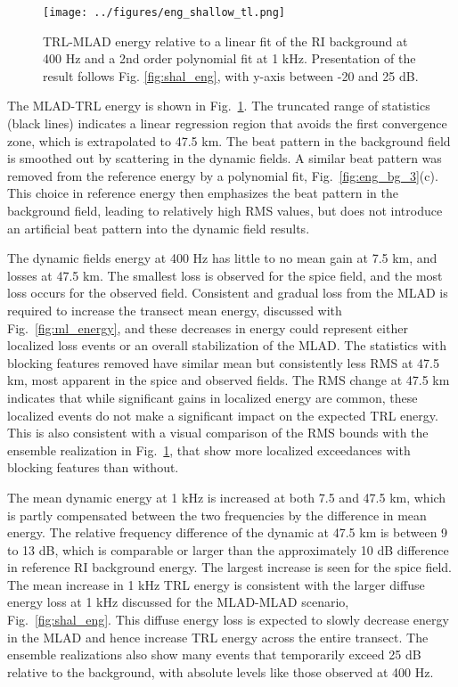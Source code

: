 \documentclass[preprint,NumberedRefs]{JASA}
\begin{document}
\begin{figure}
\texttt{[image: ../figures/eng\_shallow\_tl.png]}
        \caption{TRL-MLAD energy relative to a linear fit of the RI background at 400 Hz and a 2nd order polynomial fit at 1 kHz. Presentation of the result follows Fig. \ref{fig:shal_eng}, with y-axis between -20 and 25 dB.}
    \label{fig:eng_tl}
\end{figure}
The MLAD-TRL energy is shown in Fig.~\ref{fig:eng_tl}. The truncated range of statistics (black lines) indicates a linear regression region that avoids the first convergence zone, which is extrapolated to 47.5 km. The beat pattern in the background field is smoothed out by scattering in the dynamic fields. A similar beat pattern was removed from the reference energy by a polynomial fit, Fig.~\ref{fig:eng_bg_3}(c). This choice in reference energy then emphasizes the beat pattern in the background field, leading to relatively high RMS values, but does not introduce an artificial beat pattern into the dynamic field results.

The dynamic fields energy at 400 Hz has little to no mean gain at 7.5 km, and losses at 47.5 km. The smallest loss is observed for the spice field, and the most loss occurs for the observed field. Consistent and gradual loss from the MLAD is required to increase the transect mean energy, discussed with Fig.~\ref{fig:ml_energy}, and these decreases in energy could represent either localized loss events or an overall stabilization of the MLAD. The statistics with blocking features removed have similar mean but consistently less RMS at 47.5 km, most apparent in the spice and observed fields. The RMS change at 47.5 km indicates that while significant gains in localized energy are common, these localized events do not make a significant impact on the expected TRL energy. This is also consistent with a visual comparison of the RMS bounds with the ensemble realization in Fig.~\ref{fig:eng_tl}, that show more localized exceedances with blocking features than without.

The mean dynamic energy at 1 kHz is increased at both 7.5 and 47.5 km, which is partly compensated between the two frequencies by the difference in mean energy. The relative frequency difference of the dynamic at 47.5 km is between 9 to 13 dB, which is comparable or larger than the approximately 10 dB difference in reference RI background energy. The largest increase is seen for the spice field. The mean increase in 1 kHz TRL energy is consistent with the larger diffuse energy loss at 1 kHz discussed for the MLAD-MLAD scenario, Fig.~\ref{fig:shal_eng}. This diffuse energy loss is expected to slowly decrease energy in the MLAD and hence increase TRL energy across the entire transect. The ensemble realizations also show many events that temporarily exceed 25 dB relative to the background, with absolute levels like those observed at 400 Hz.
\end{document}
